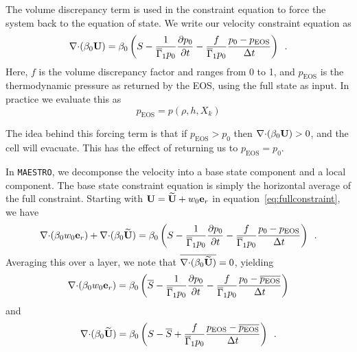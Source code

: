 The volume discrepancy term is used in the constraint equation to
force the system back to the equation of state.  We write our velocity
constraint equation as
\begin{equation}
\mathbf{\nabla} \mathbf{\cdot} (\beta_0 {\bf U})  = \beta_0 \left(S - \frac{1}{\overline{\Gamma}_1 p_0} \frac{\partial p_0}{\partial t} - \frac{f}{\overline{\Gamma}_1 p_0} \frac{p_0 - p_\mathrm{EOS}}{\Delta t} \right ) \enskip .
\label{eq:fullconstraint}
\end{equation}
Here, $f$ is the volume discrepancy factor and ranges from 0 to 1, and
$p_\mathrm{EOS}$ is the thermodynamic pressure as returned by the EOS,
using the full state as input.
In practice we evaluate this as
\begin{equation}
p_\mathrm{EOS} = p(\rho,h,X_k)
\end{equation}

The idea behind this forcing term is that if $p_\mathrm{EOS} > p_0$ then
$\mathbf{\nabla} \mathbf{\cdot} (\beta_0 {\bf U}) > 0$, and the cell will evacuate.  This
has the effect of returning us to $p_\mathrm{EOS} = p_0$.

In {\tt MAESTRO}, we decomponse the velocity into a base state component
and a local component.  The base state constraint equation is simply
the horizontal average of the full constraint.  Starting with 
${\bf U} = \widetilde{{\bf U}} + w_0 \mathbf{e}_r$ in equation~\ref{eq:fullconstraint}, we have
\begin{equation}
\mathbf{\nabla} \mathbf{\cdot} (\beta_0 w_0 \mathbf{e}_r) + \mathbf{\nabla} \mathbf{\cdot} (\beta_0 \widetilde{{\bf U}})  = \beta_0 \left(S - \frac{1}{\overline{\Gamma}_1 p_0} \frac{\partial p_0}{\partial t} - \frac{f}{\overline{\Gamma}_1 p_0} \frac{p_0 - p_\mathrm{EOS}}{\Delta t} \right ) \enskip .
\label{eq:fullconstraint2}
\end{equation}
Averaging this over a layer, we note that $\overline{\mathbf{\nabla} \mathbf{\cdot} (\beta_0 \widetilde{{\bf U}})} = 0$,
yielding
\begin{equation}
\mathbf{\nabla} \mathbf{\cdot} (\beta_0 w_0 \mathbf{e}_r)  = \beta_0 \left(\overline{S} - \frac{1}{\overline{\Gamma}_1 p_0} \frac{\partial p_0}{\partial t} - \frac{f}{\overline{\Gamma}_1 p_0} \frac{p_0 - \overline{p_\mathrm{EOS}}}{\Delta t} \right ) 
\label{eq:w0constraint_vd}
\end{equation}
and
\begin{equation}
\mathbf{\nabla} \mathbf{\cdot} (\beta_0 \widetilde{{\bf U}})  = \beta_0 \left(S - \overline{S} + \frac{f}{\overline{\Gamma}_1 p_0} \frac{p_\mathrm{EOS} - \overline{p_\mathrm{EOS}}}{\Delta t} \right ) \enskip .
\label{eq:Utconstraint_vd}
\end{equation}



